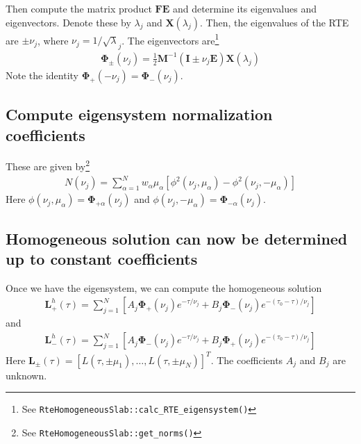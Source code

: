\documentclass[11pt]{article}
\newcommand{\mvec}[1]{\mathbf{#1}}
\newcommand{\gvec}[1]{\boldsymbol{#1}}
\begin{document}
Then compute the matrix product $\mvec{F}\mvec{E}$ and determine its
eigenvalues and eigenvectors. Denote these by $\lambda_j$ and
$\mvec{X}(\lambda_j)$.  Then, the eigenvalues of the RTE are $\pm
\nu_j$, where $\nu_j = 1/\sqrt\lambda_j$. The eigenvectors
are\footnote{See {\tt RteHomogeneousSlab::calc\_RTE\_eigensystem()}}
\begin{align}
  \gvec{\Phi}_\pm (\nu_j)
  = \frac{1}{2}\mvec{M}^{-1}
  (\mvec{I} \pm \nu_j\mvec{E})\mvec{X}(\lambda_j)
\end{align}
Note the identity $\gvec{\Phi}_+(-\nu_j) =
\gvec{\Phi}_-(\nu_j)$.




\subsection{Compute eigensystem normalization coefficients}
These are given by\footnote{See {\tt RteHomogeneousSlab::get\_norms()}}
\begin{align}
  N(\nu_j) = \sum_{\alpha=1}^N
  w_\alpha \mu_\alpha
  \left[
    \phi^2(\nu_j,\mu_\alpha) - \phi^2(\nu_j,-\mu_\alpha)
  \right]
\end{align}
Here $\phi(\nu_j,\mu_\alpha) = \gvec{\Phi}_{+\alpha}(\nu_j)$ and
$\phi(\nu_j,-\mu_\alpha) = \gvec{\Phi}_{-\alpha}(\nu_j)$.





\subsection{Homogeneous solution can now be determined up to constant
  coefficients}
Once we have the eigensystem, we can compute the homogeneous solution
\begin{align}
  \mvec{L}^h_+(\tau) = \sum_{j=1}^N
  \left[
    A_j \gvec{\Phi}_+(\nu_j) e^{-\tau/\nu_j} +
    B_j \gvec{\Phi}_-(\nu_j) e^{-(\tau_0-\tau)/\nu_j}
  \right]
\end{align}
and
\begin{align}
  \mvec{L}^h_-(\tau) = \sum_{j=1}^N
  \left[
    A_j \gvec{\Phi}_-(\nu_j) e^{-\tau/\nu_j} +
    B_j \gvec{\Phi}_+(\nu_j) e^{-(\tau_0-\tau)/\nu_j}
  \right]
\end{align}
Here $\mvec{L}_\pm(\tau) = [L(\tau,\pm\mu_1),\ldots,
L(\tau,\pm\mu_N)]^T$. The coefficients $A_j$ and $B_j$ are unknown.
\end{document}
